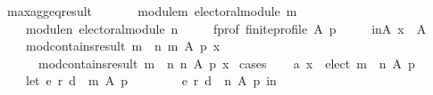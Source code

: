 \begin{isabellebody}
\endisadelimdocument
%
\isatagdocument
%
\isamarkuptrue%
%
\endisatagdocument
{\isafolddocument}%
%
\isadelimdocument
%
\endisadelimdocument
{}\isamarkupfalse%
\ max{\isacharunderscore}{\kern0pt}agg{\isacharunderscore}{\kern0pt}eq{\isacharunderscore}{\kern0pt}result{\isacharcolon}{\kern0pt}\isanewline
\ \ \isanewline
\ \ \ \ module{\isacharunderscore}{\kern0pt}m{\isacharcolon}{\kern0pt}\ {\isachardoublequoteopen}electoral{\isacharunderscore}{\kern0pt}module\ m{\isachardoublequoteclose}\ \isanewline
\ \ \ \ module{\isacharunderscore}{\kern0pt}n{\isacharcolon}{\kern0pt}\ {\isachardoublequoteopen}electoral{\isacharunderscore}{\kern0pt}module\ n{\isachardoublequoteclose}\ \isanewline
\ \ \ \ f{\isacharunderscore}{\kern0pt}prof{\isacharcolon}{\kern0pt}\ {\isachardoublequoteopen}finite{\isacharunderscore}{\kern0pt}profile\ A\ p{\isachardoublequoteclose}\ \isanewline
\ \ \ \ in{\isacharunderscore}{\kern0pt}A{\isacharcolon}{\kern0pt}\ {\isachardoublequoteopen}x\ {\isasymin}\ A{\isachardoublequoteclose}\isanewline
\ \ \isanewline
\ \ \ \ {\isachardoublequoteopen}mod{\isacharunderscore}{\kern0pt}contains{\isacharunderscore}{\kern0pt}result\ {\isacharparenleft}{\kern0pt}m\ {\isasymparallel}\isactrlsub {\isasymup}\ n{\isacharparenright}{\kern0pt}\ m\ A\ p\ x\ {\isasymor}\isanewline
\ \ \ \ \ \ mod{\isacharunderscore}{\kern0pt}contains{\isacharunderscore}{\kern0pt}result\ {\isacharparenleft}{\kern0pt}m\ {\isasymparallel}\isactrlsub {\isasymup}\ n{\isacharparenright}{\kern0pt}\ n\ A\ p\ x{\isachardoublequoteclose}\isanewline
%
\isadelimproof
%
\endisadelimproof
%
\isatagproof
{}\isamarkupfalse%
\ cases\isanewline
\ \ \isamarkupfalse%
\ a{}{\isacharcolon}{\kern0pt}\ {\isachardoublequoteopen}x\ {\isasymin}\ elect\ {\isacharparenleft}{\kern0pt}m\ {\isasymparallel}\isactrlsub {\isasymup}\ n{\isacharparenright}{\kern0pt}\ A\ p{\isachardoublequoteclose}\isanewline
\ \ \isamarkupfalse%
\isanewline
\ \ \ \ {\isachardoublequoteopen}let\ {\isacharparenleft}{\kern0pt}e{}{\isacharcomma}{\kern0pt}\ r{}{\isacharcomma}{\kern0pt}\ d{}{\isacharparenright}{\kern0pt}\ {\isacharequal}{\kern0pt}\ m\ A\ p{\isacharsemicolon}{\kern0pt}\isanewline
\ \ \ \ \ \ \ \ {\isacharparenleft}{\kern0pt}e{}{\isacharcomma}{\kern0pt}\ r{}{\isacharcomma}{\kern0pt}\ d{}{\isacharparenright}{\kern0pt}\ {\isacharequal}{\kern0pt}\ n\ A\ p\ in\isanewline

\end{isabellebody}
